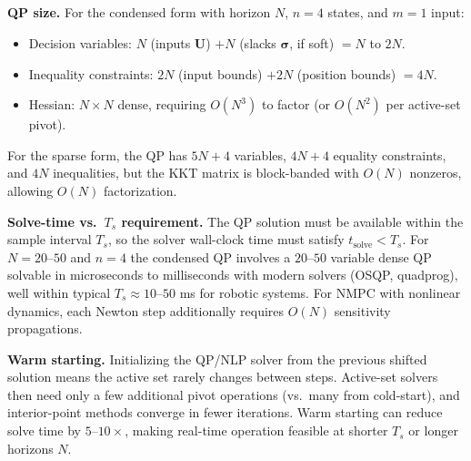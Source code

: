 \subsection{}
\textbf{QP size.} For the condensed form with horizon $N$, $n = 4$ states, and $m = 1$ input:
\begin{itemize}
    \item Decision variables: $N$ (inputs $\mathbf{U}$) $+ N$ (slacks $\boldsymbol{\sigma}$, if soft) $= N$ to $2N$.
    \item Inequality constraints: $2N$ (input bounds) $+ 2N$ (position bounds) $= 4N$.
    \item Hessian: $N \times N$ dense, requiring $O(N^3)$ to factor (or $O(N^2)$ per active-set pivot).
\end{itemize}
For the sparse form, the QP has $5N + 4$ variables, $4N + 4$ equality constraints, and $4N$ inequalities, but the KKT matrix is block-banded with $O(N)$ nonzeros, allowing $O(N)$ factorization.

\textbf{Solve-time vs.\ $T_s$ requirement.} The QP solution must be available within the sample interval $T_s$, so the solver wall-clock time must satisfy $t_{\mathrm{solve}} < T_s$. For $N = 20$--$50$ and $n = 4$ the condensed QP involves a $20$--$50$ variable dense QP solvable in microseconds to milliseconds with modern solvers (OSQP, quadprog), well within typical $T_s \approx 10$--$50$ ms for robotic systems. For NMPC with nonlinear dynamics, each Newton step additionally requires $O(N)$ sensitivity propagations.

\textbf{Warm starting.} Initializing the QP/NLP solver from the previous shifted solution means the active set rarely changes between steps. Active-set solvers then need only a few additional pivot operations (vs.\ many from cold-start), and interior-point methods converge in fewer iterations. Warm starting can reduce solve time by $5$--$10\times$, making real-time operation feasible at shorter $T_s$ or longer horizons $N$.

